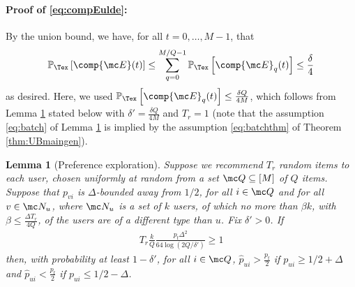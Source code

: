 \documentclass{article}
\newtheorem{lemma}{Lemma}
\newcommand\pf{p_{\mathrm{f}}}
\newcommand{\setQ}{\mc Q}
\renewcommand\PR[2][\Tex]{
\ifthenelse{\equal{#1}{}}{{\mathbb P}\left[#2\right]}{\ensuremath{{\mathbb P}_{#1}\left[ #2\right]}}}
\begin{document}
\paragraph{Proof of \eqref{eq:compEulde}:}
By the union bound, we have, for all $t=0,\ldots,M-1$, that 
\[
\PR{\comp{\mc E}(t) } 
%
%
\leq \sum_{q=0}^{M/Q-1}
\PR{\comp{\mc E}_{q}(t) }
%
\leq \frac{\delta}{4}
\]
as desired. 
Here, we used $\PR{\comp{\mc E}_{q}(t) } \leq \frac{\delta Q}{4M}$, which follows from Lemma \ref{lem:randexpbatch} stated below with $\delta'= \frac{\delta Q}{4M}$ and $T_r=1$ (note that the assumption \eqref{eq:batch} of Lemma \ref{lem:randexpbatch} is implied by the assumption \eqref{eq:batchthm} of Theorem \ref{thm:UBmaingen}). 

\begin{lemma}[Preference exploration]
Suppose we recommend $T_r$ random items to each user, chosen uniformly at random from a set $\setQ \subseteq [M]$ of $Q$ items. 
Suppose that $p_{vi}$ is $\Delta$-bounded away from $1/2$, for all $i \in \setQ$ and for all $v \in \mc N_u$, where $\mc N_u$ is a set of $k$ users, of which no more than $\beta k$, with $\beta \leq \frac{\Delta T_r}{4Q}$, of the users are of a different type than $u$. 
Fix $\delta'>0$. If 
\begin{align}
T_r  \frac{k}{Q} \frac{\pf \Delta^2 }{ 64 \log(2 Q / \delta')} \geq 1
\label{eq:batch}
\end{align}
then, with probability at least $1- \delta'$, for all $i \in \setQ$, 
$\hat p_{ui} > \frac{\pf}{2}$ if $p_{ui} \geq 1/2 + \Delta$ and $\hat p_{ui} < \frac{\pf}{2}$ if $p_{ui} \leq 1/2 - \Delta$. 
\label{lem:randexpbatch}
\end{lemma}


\end{document}
